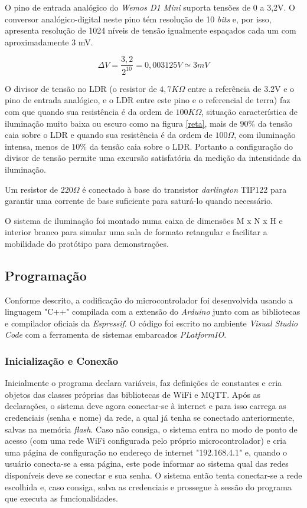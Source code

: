 O pino de entrada analógico do \textit{Wemos D1 Mini} suporta tensões de 0 a 3,2V. O conversor analógico-digital neste pino tém resolução de 10 \textit{bits} e, por isso, apresenta resolução de 1024 níveis de tensão igualmente espaçados cada um com aproximadamente 3 mV.

\begin{equation}
    \label{eq:pj_1}
    \Delta V = \frac{3,2}{2^{10}} = 0,003125 V \simeq 3 mV
\end{equation}

O divisor de tensão no LDR (o resistor de $4,7K\Omega$ entre a referência de 3.2V e o pino de entrada analógico, e o LDR entre este pino e o referencial de terra) faz com que quando sua resistência é da ordem de $100K\Omega$, situação característica de iluminação muito baixa ou escuro como na figura \ref{reta}, mais de $90\%$ da tensão caia sobre o LDR e quando sua resistência é da ordem de $100\Omega$, com iluminação intensa, menos de $10\%$ da tensão caia sobre o LDR. Portanto a configuração do divisor de tensão permite uma excursão satisfatória da medição da intensidade da iluminação.

Um resistor de $220\Omega$ é conectado à base do transistor \textit{darlington} TIP122 para garantir uma corrente de base suficiente para saturá-lo quando necessário.

O sistema de iluminação foi montado numa caixa de dimensões M x N x H e interior branco para simular uma sala de formato retangular e facilitar a mobilidade do protótipo para demonstrações.

\subsection{Programação}

Conforme descrito, a codificação do microcontrolador foi desenvolvida usando a linguagem "C++" compilada com a extensão do \textit{Arduino} junto com as bibliotecas e compilador oficiais da \textit{Espressif}. O código foi escrito no ambiente \textit{Visual Studio Code} com a ferramenta de sistemas embarcados \textit{PLatformIO}.

\subsubsection{Inicialização e Conexão}

Inicialmente o programa declara variáveis, faz definições de constantes e cria objetos das classes próprias das bibliotecas de \ac{WiFi} e \ac{MQTT}. Após as declarações, o sistema deve agora conectar-se à internet e para isso carrega as credenciais (senha e nome) da rede, a qual já tenha se conectado anteriormente, salvas na memória \textit{flash}. Caso não consiga, o sistema entra no modo de ponto de acesso (com uma rede WiFi configurada pelo próprio microcontrolador) e cria uma página de configuração no endereço de internet "192.168.4.1" e, quando o usuário conecta-se a essa página, este pode informar ao sistema qual das redes disponíveis deve se conectar e sua senha. O sistema então tenta conectar-se a rede escolhida e, caso consiga, salva as credenciais e prossegue à sessão do programa que executa as funcionalidades. 

